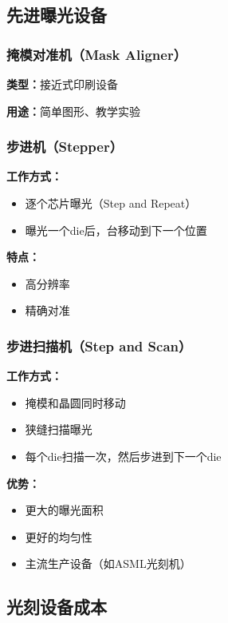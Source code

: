 \documentclass[UTF8,12pt,a4paper]{ctexart}
\begin{document}
\subsection{先进曝光设备}

\subsubsection{掩模对准机（Mask Aligner）}

\textbf{类型：}接近式印刷设备

\textbf{用途：}简单图形、教学实验

\subsubsection{步进机（Stepper）}

\textbf{工作方式：}
\begin{itemize}
    \item 逐个芯片曝光（Step and Repeat）
    \item 曝光一个die后，台移动到下一个位置
\end{itemize}

\textbf{特点：}
\begin{itemize}
    \item 高分辨率
    \item 精确对准
\end{itemize}

\subsubsection{步进扫描机（Step and Scan）}

\textbf{工作方式：}
\begin{itemize}
    \item 掩模和晶圆同时移动
    \item 狭缝扫描曝光
    \item 每个die扫描一次，然后步进到下一个die
\end{itemize}

\textbf{优势：}
\begin{itemize}
    \item 更大的曝光面积
    \item 更好的均匀性
    \item 主流生产设备（如ASML光刻机）
\end{itemize}

\subsection{光刻设备成本}
\end{document}
